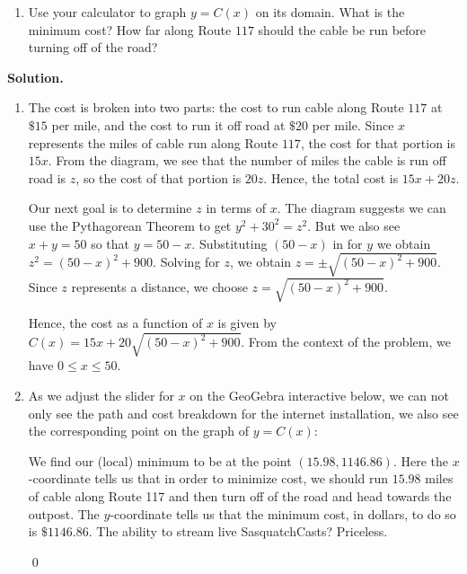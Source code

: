 \documentclass{ximera}
\begin{document}
\begin{example}
\begin{enumerate}
\item  Use your calculator to graph $y=C(x)$ on its domain.  What is the minimum cost?  How far along Route $117$ should the cable be run before turning off of the road?

\end{enumerate}






{\bf Solution.}

\begin{enumerate}

\item  The cost is broken into two parts:  the cost to run cable along Route $117$ at $\$15$ per mile, and the cost to run it off road at $\$20$ per mile.  Since $x$ represents the miles of cable run along Route $117$, the cost  for that portion is $15x$.  
From the diagram, we see that the number of miles the cable is run off road is $z$, so the cost of that portion is $20z$.  Hence, the total cost is $15x + 20z$.  

\smallskip

Our next goal is to determine $z$ in terms of $x$.  The diagram suggests we can use the Pythagorean Theorem to get $y^2+30^2 = z^2$.  But we also see $x+y = 50$ so that $y=50-x$.  Substituting $(50-x)$ in for $y$ we obtain $z^2 = (50-x)^2+900$.  Solving for $z$, we obtain $z = \pm \sqrt{(50-x)^2+900}$.  Since $z$ represents a distance, we choose $z = \sqrt{(50-x)^2+900}$.

Hence, the cost as a function of $x$  is given by $C(x) = 15x + 20\sqrt{(50-x)^2+900}$.  From the context of the problem, we have $0 \leq x \leq 50$.



\item  As we adjust the slider for $x$ on the  GeoGebra interactive below,  we can not only see the path and cost breakdown for the internet installation, we also see the corresponding point on the graph of $y = C(x)$: 



\begin{center}
\end{center}






We find our (local) minimum to be at the point $(15.98, 1146.86)$.  Here the $x$-coordinate tells us that in order to minimize cost, we should run $15.98$ miles of cable along Route 117 and then turn off of the road and head towards the outpost. The $y$-coordinate tells us that the minimum cost, in dollars, to do so is $\$1146.86$.  The ability to stream live SasquatchCasts?  Priceless.



 \qed

\end{enumerate}

\end{example}




\closegraphsfile
\end{document}
